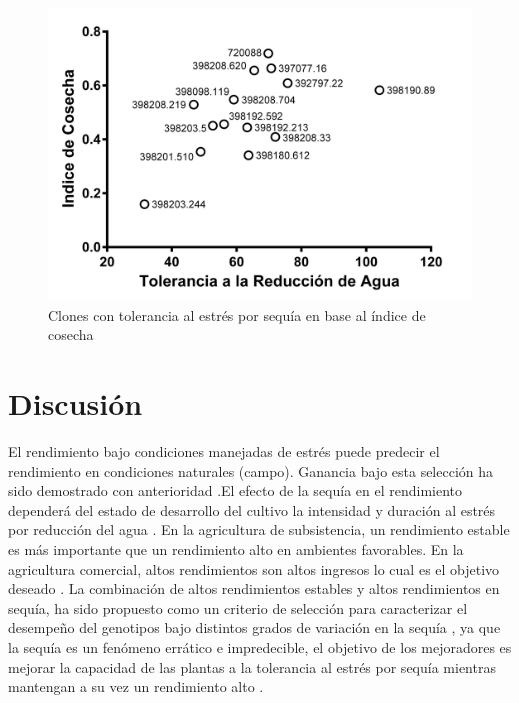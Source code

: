 \documentclass[fleqn,10pt]{Flavio}\usepackage[]{graphicx}\usepackage[]{color}
\begin{document}
\begin{figure}[ht]\centering
\includegraphics[width=\linewidth]{TRA-IC}
\caption{Clones con tolerancia al estr\'es por sequ\'ia en base al \'indice de cosecha}
\label{fig:TDWS2}
\end{figure}

\section{Discusi\'on}

El rendimiento bajo condiciones manejadas de estr\'es puede predecir el rendimiento en condiciones naturales (campo). Ganancia bajo esta selecci\'on ha sido demostrado con anterioridad \citep{IRRI18/06/14}.El efecto de la sequ\'ia en el rendimiento depender\'a del estado de desarrollo del cultivo la intensidad y duraci\'on al estr\'es por reducci\'on del agua \citep{Kumar1994}. En la agricultura de subsistencia, un rendimiento estable es m\'as importante que un rendimiento alto en ambientes favorables. En la agricultura comercial,  altos rendimientos son altos ingresos lo cual es el objetivo deseado \citep{Rosielle1981}. La combinaci\'on de altos rendimientos estables y altos rendimientos en sequ\'ia, ha sido propuesto como un criterio de selecci\'on para caracterizar el desempe\~no del genotipos bajo distintos grados de variaci\'on en la sequ\'ia \citep{AHMAD2003}, ya que la sequ\'ia es un fen\'omeno err\'atico e impredecible, el objetivo de los mejoradores es mejorar la capacidad de las plantas a la tolerancia al estr\'es por sequ\'ia mientras mantengan a su vez un rendimiento alto \citep{Spitters1990}. 
\end{document}
